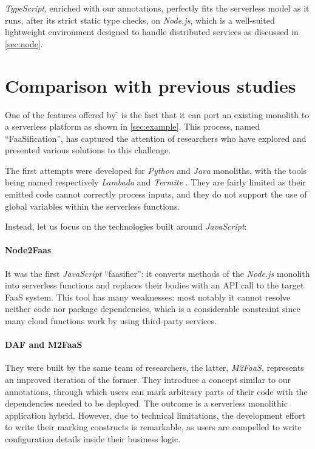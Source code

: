 \textit{TypeScript}, enriched with our annotations, perfectly fits
the serverless model as it runs, after its strict static type checks,
on \textit{Node.js}, which is a well-suited lightweight environment
designed to handle distributed services as discussed in \cref{sec:node}.

\section{Comparison with previous studies}

One of the features offered by \f{} is the fact that it can port
an existing monolith to a serverless platform as shown in \cref{sec:example}.
This process, named ``FaaSification'', has captured the attention of researchers
who have explored and presented various solutions to this challenge.

The first attempts were developed for \textit{Python} and \textit{Java} monoliths,
with the tools being named respectively \textit{Lambada} \cite{lambada} and \textit{Termite} \cite{termite}.
They are fairly limited as their emitted code cannot correctly process inputs,
and they do not support the use of global variables within the serverless functions.

Instead, let us focus on the technologies built around \textit{JavaScript}:

\paragraph{\textbf{Node2Faas} \cite{node2faas}}
It was the first \textit{JavaScript} ``faasifier'':
it converts methods of the \textit{Node.js} monolith into serverless
functions and replaces their bodies with an API call to the target FaaS system.
This tool has many weaknesses: most notably it cannot resolve neither code
nor package dependencies, which is a considerable constraint since many
cloud functions work by using third-party services.

\paragraph{\textbf{DAF} and \textbf{M2FaaS} \cite{daf, m2faas}}
They were built by the same team of researchers, the latter, \textit{M2FaaS},
represents an improved iteration of the former.
They introduce a concept similar to our annotations, through which users
can mark arbitrary parts of their code with the dependencies needed to be deployed.
The outcome is a serverless monolithic application hybrid. 
However, due to technical limitations, the development effort to write their marking constructs
is remarkable, as users are compelled to write configuration details inside their business logic.

